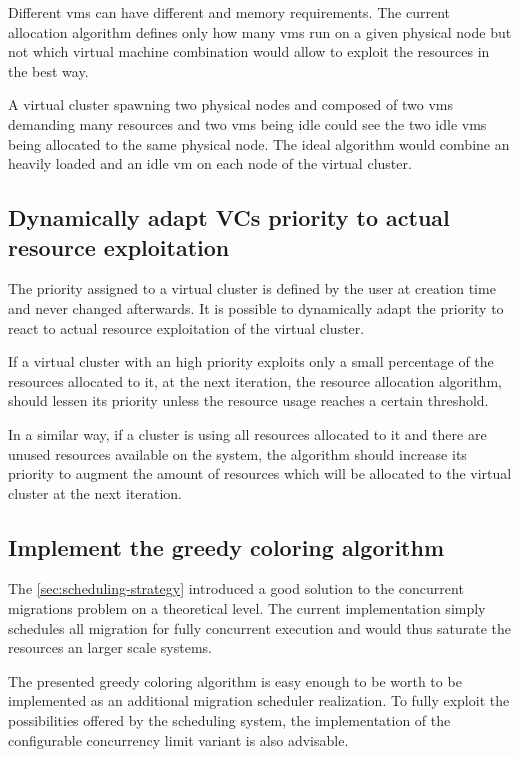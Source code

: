 Different \glspl{vm} can have different  and memory requirements. The current allocation algorithm defines only how many \glspl{vm} run on a given physical node but not which virtual machine combination would allow to exploit the resources in the best way.

A virtual cluster spawning two physical nodes and composed of two \glspl{vm} demanding many resources and two \glspl{vm} being idle could see the two idle \glspl{vm} being allocated to the same physical node. The ideal algorithm would combine an heavily loaded and an idle \gls{vm} on each node of the virtual cluster.


\subsection{Dynamically adapt VCs priority to actual resource exploitation}

The priority assigned to a virtual cluster is defined by the user at creation time and never changed afterwards. It is possible to dynamically adapt the priority to react to actual resource exploitation of the virtual cluster.

If a virtual cluster with an high priority exploits only a small percentage of the resources allocated to it, at the next iteration, the resource allocation algorithm, should lessen its priority unless the resource usage reaches a certain threshold.

In a similar way, if a cluster is using all resources allocated to it and there are unused resources available on the system, the algorithm should increase its priority to augment the amount of resources which will be allocated to the virtual cluster at the next iteration.


\subsection{Implement the greedy coloring algorithm}

The \autoref{sec:scheduling-strategy} introduced a good solution to the concurrent migrations problem on a theoretical level. The current implementation simply schedules all migration for fully concurrent execution and would thus saturate the resources an larger scale systems.

The presented greedy coloring algorithm is easy enough to be worth to be implemented as an additional migration scheduler realization. To fully exploit the possibilities offered by the scheduling system, the implementation of the configurable concurrency limit variant is also advisable.


